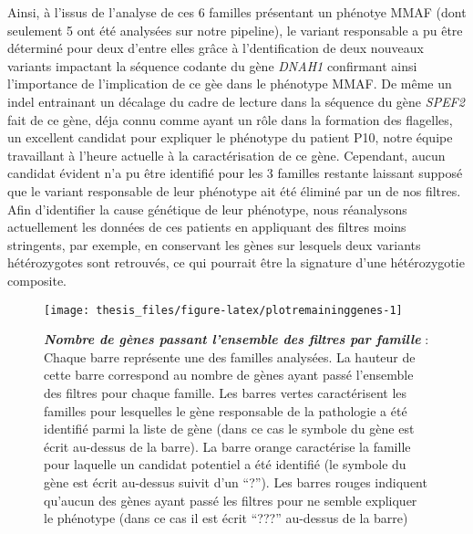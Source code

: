 \documentclass[12pt,twoside]{ugathesis}
\begin{document}
Ainsi, à l'issus de l'analyse de ces 6 familles présentant un phénotye
MMAF (dont seulement 5 ont été analysées sur notre pipeline), le variant
responsable a pu être déterminé pour deux d'entre elles grâce à
l'dentification de deux nouveaux variants impactant la séquence codante
du gène \emph{DNAH1} confirmant ainsi l'importance de l'implication de
ce gèe dans le phénotype MMAF. De même un indel entrainant un décalage
du cadre de lecture dans la séquence du gène \emph{SPEF2} fait de ce
gène, déja connu comme ayant un rôle dans la formation des flagelles, un
excellent candidat pour expliquer le phénotype du patient P10, notre
équipe travaillant à l'heure actuelle à la caractérisation de ce gène.
Cependant, aucun candidat évident n'a pu être identifié pour les 3
familles restante laissant supposé que le variant responsable de leur
phénotype ait été éliminé par un de nos filtres. Afin d'identifier la
cause génétique de leur phénotype, nous réanalysons actuellement les
données de ces patients en appliquant des filtres moins stringents, par
exemple, en conservant les gènes sur lesquels deux variants
hétérozygotes sont retrouvés, ce qui pourrait être la signature d'une
hétérozygotie composite.

\newpage

\begin{figure}

{\centering \texttt{[image: thesis\_files/figure-latex/plotremaininggenes-1]} 

}

\caption[Nombre de gènes passant l'ensemble des filtres par famille]{\textbf{\emph{Nombre de gènes passant
l'ensemble des filtres par famille}} : Chaque barre représente une des
familles analysées. La hauteur de cette barre correspond au nombre de
gènes ayant passé l'ensemble des filtres pour chaque famille. Les barres
vertes caractérisent les familles pour lesquelles le gène responsable de
la pathologie a été identifié parmi la liste de gène (dans ce cas le
symbole du gène est écrit au-dessus de la barre). La barre orange
caractérise la famille pour laquelle un candidat potentiel a été
identifié (le symbole du gène est écrit au-dessus suivit d'un ``?'').
Les barres rouges indiquent qu'aucun des gènes ayant passé les filtres
pour ne semble expliquer le phénotype (dans ce cas il est écrit ``???''
au-dessus de la barre)}\label{fig:plotremaininggenes}
\end{figure}
\end{document}

